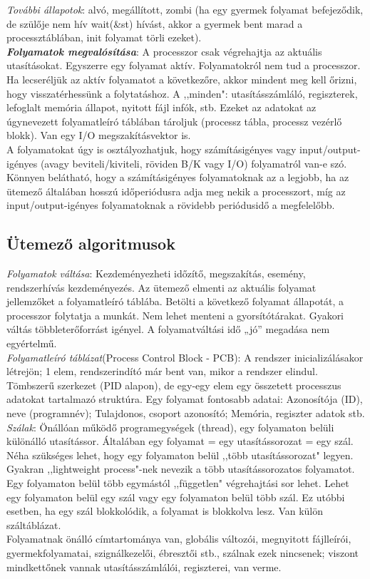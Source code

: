 \documentclass[margin=0px]{article}
\begin{document}
\textit{További állapotok}: alvó, megállított, zombi (ha egy gyermek folyamat befejeződik, de szülője nem hív wait(\&st) hívást, akkor a gyermek bent marad a processztáblában, init folyamat törli ezeket). \\
\textit{\textbf{Folyamatok megvalósítása}}: A processzor csak végrehajtja az aktuális utasításokat. Egyszerre egy folyamat aktív. Folyamatokról nem tud a processzor. Ha lecseréljük az aktív folyamatot a következőre, akkor mindent meg kell őrizni, hogy visszatérhessünk a folytatáshoz. A ,,minden": utasításszámláló, regiszterek, lefoglalt memória állapot, nyitott fájl infók, stb. Ezeket az adatokat az úgynevezett folyamatleíró táblában tároljuk (processz tábla, processz vezérlő blokk). Van egy I/O megszakításvektor is. \\
A folyamatokat úgy is osztályozhatjuk, hogy számításigényes vagy input/output-igényes (avagy beviteli/kiviteli, röviden B/K vagy I/O) folyamatról van-e szó. Könnyen belátható, hogy a számításigényes folyamatoknak az a legjobb, ha az ütemező általában hosszú időperiódusra adja meg nekik a processzort, míg az input/output-igényes folyamatoknak a rövidebb periódusidő a megfelelőbb.

\subsection{Ütemező algoritmusok}

\textit{Folyamatok váltása}: Kezdeményezheti időzítő, megszakítás, esemény, rendszerhívás kezdeményezés. Az ütemező elmenti az aktuális folyamat jellemzőket a folyamatleíró táblába. Betölti a következő folyamat állapotát, a processzor folytatja a munkát. Nem lehet menteni a gyorsítótárakat. Gyakori váltás többleterőforrást igényel. A folyamatváltási idő „jó” megadása nem egyértelmű. \\
\textit{Folyamatleíró táblázat}(Process Control Block - PCB): A rendszer inicializálásakor létrejön; 1 elem, rendszerindító már bent van, mikor a rendszer elindul. Tömbszerű szerkezet (PID alapon), de egy-egy elem egy összetett processzus adatokat tartalmazó struktúra. Egy folyamat fontosabb adatai: Azonosítója (ID), neve (programnév); Tulajdonos, csoport azonosító; Memória, regiszter adatok stb. \\
\textit{Szálak}: Önállóan működő programegységek (thread), egy folyamaton belüli különálló utasítássor. Általában egy folyamat = egy utasítássorozat = egy szál. Néha szükséges lehet, hogy egy folyamaton belül ,,több utasítássorozat" legyen. Gyakran ,,lightweight process"-nek nevezik a több utasítássorozatos folyamatot. Egy folyamaton belül több egymástól ,,független" végrehajtási sor lehet. Lehet egy folyamaton belül egy szál vagy egy folyamaton belül több szál. Ez utóbbi esetben, ha egy szál blokkolódik, a folyamat is blokkolva lesz. Van külön száltáblázat. \\
Folyamatnak önálló címtartománya van, globális változói, megnyitott fájlleírói, gyermekfolyamatai, szignálkezelői, ébresztői stb., szálnak ezek nincsenek; viszont mindkettőnek vannak utasításszámlálói, regiszterei, van verme. \\ \\
\end{document}
